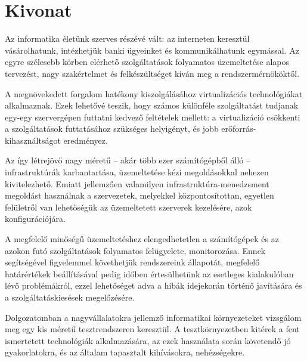 \setcounter{page}{1}

\selecthungarian

\chapter*{Kivonat}

Az informatika életünk szerves részévé vált: az interneten keresztül vásárolhatunk, intézhetjük banki ügyeinket és kommunikálhatunk egymással. Az egyre szélesebb körben elérhető szolgáltatások folyamatos üzemeltetése alapos tervezést, nagy szakértelmet és felkészültséget kíván meg a rendszermérnököktől.

A megnövekedett forgalom hatékony kiszolgálásához virtualizációs technológiákat alkalmaznak. Ezek lehetővé teszik, hogy számos különféle szolgáltatást tudjanak egy-egy szervergépen futtatni kedvező feltételek mellett: a virtualizáció csökkenti a szolgáltatások futtatásához szükséges helyigényt, és jobb erőforrás-kihasználtságot eredményez.

Az így létrejövő nagy méretű -- akár több ezer számítógépből álló -- infrastruktúrák karbantartása, üzemeltetése kézi megoldásokkal nehezen kivitelezhető. Emiatt jellemzően valamilyen infrastruktúra-menedzsment megoldást használnak a szervezetek, melyekkel központosítottan, egyetlen felületről van lehetőségük az üzemeltetett szerverek kezelésére, azok konfigurációjára.

A megfelelő minőségű üzemeltetéshez elengedhetetlen a számítógépek és az azokon futó szolgáltatások folyamatos felügyelete, monitorozása. Ennek segítségével figyelemmel követhetjük rendszereink állapotát, megfelelő határértékek beállításával pedig időben értesülhetünk az esetleges kialakulóban lévő problémákról, ezzel lehetőséget adva a hibák idejekorán történő javítására és a szolgáltatáskiesések megelőzésére.

Dolgozatomban a nagyvállalatokra jellemző informatikai környezeteket vizsgálom meg egy kis méretű tesztrendszeren keresztül. A tesztkörnyezetben kitérek a fent ismertetett technológiák alkalmazására, az ezek használata során követendő jó gyakorlatokra, és az általam tapasztalt kihívásokra, nehézségekre.


\vfill
\selectenglish


